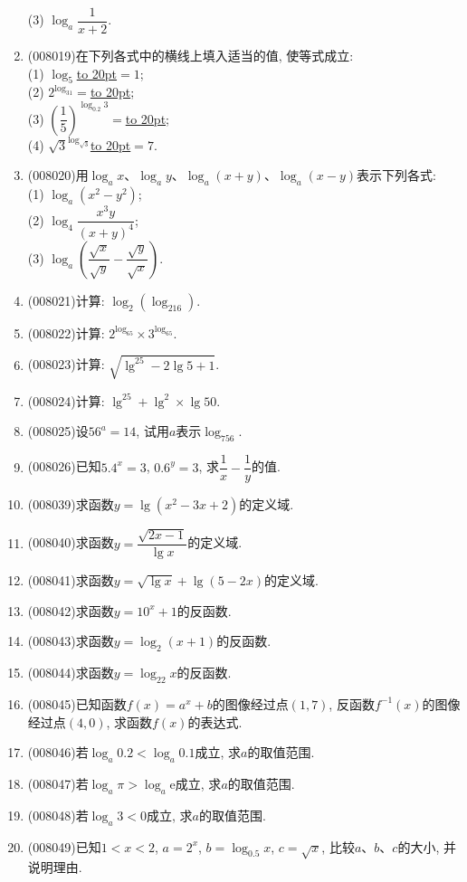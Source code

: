 \documentclass[10pt,a4paper]{article}
\newcommand{\blank}[1]{\underline{\hbox to #1pt{}}}
\begin{document}
\begin{enumerate}[1.]
(3) $\log _a\dfrac 1{x+2}$.
\item {\tiny (008019)}在下列各式中的横线上填入适当的值, 使等式成立:\\
(1) $\log _5$\blank{20}$=1$;\\
(2) $2^{\log _31}=$\blank{20};\\
(3) $(\dfrac 15)^{\log _{0.2}3}=$\blank{20};\\
(4) $\sqrt 3^{\log _{\sqrt 3}}$\blank{20}$=7$.
\item {\tiny (008020)}用$\log _ax$、$\log _ay$、$\log _a(x+y)$、$\log _a(x-y)$表示下列各式:\\
(1) $\log _a(x^2-y^2)$;\\
(2) $\log _4\dfrac{x^3y}{(x+y)^4}$;\\
(3) $\log _a(\dfrac{\sqrt x}{\sqrt y}-\dfrac{\sqrt y}{\sqrt x})$.
\item {\tiny (008021)}计算: $\log _2(\log _216)$.
\item {\tiny (008022)}计算: $2^{\log _65}\times 3^{\log _65}$.
\item {\tiny (008023)}计算: $\sqrt {\lg^25-2\lg 5+1}$.
\item {\tiny (008024)}计算: $\lg ^25+\lg ^2\times \lg 50$.
\item {\tiny (008025)}设$56^a=14$, 试用$a$表示$\log _756$.
\item {\tiny (008026)}已知$5.4^x=3$, $0.6^y=3$, 求$\dfrac 1x-\dfrac 1y$的值.
\item {\tiny (008039)}求函数$y=\lg (x^2-3x+2)$的定义域.
\item {\tiny (008040)}求函数$y=\dfrac{\sqrt {2x-1}}{\lg x}$的定义域.
\item {\tiny (008041)}求函数$y=\sqrt {\lg x}+\lg (5-2x)$的定义域.
\item {\tiny (008042)}求函数$y=10^x+1$的反函数.
\item {\tiny (008043)}求函数$y=\log _2(x+1)$的反函数.
\item {\tiny (008044)}求函数$y=\log _22x$的反函数.
\item {\tiny (008045)}已知函数$f(x)=a^x+b$的图像经过点$(1, 7)$, 反函数$f^{-1}(x)$的图像经过点$(4, 0)$, 求函数$f(x)$的表达式.
\item {\tiny (008046)}若$\log _a0.2<\log _a0.1$成立, 求$a$的取值范围.
\item {\tiny (008047)}若$\log _a\pi >\log _a\mathrm{e}$成立, 求$a$的取值范围.
\item {\tiny (008048)}若$\log _a3<0$成立, 求$a$的取值范围.
\item {\tiny (008049)}已知$1<x<2$, $a=2^x$, $b=\log _{0.5}x$, $c=\sqrt x$, 比较$a$、$b$、$c$的大小, 并说明理由.

\end{enumerate}
\end{document}
